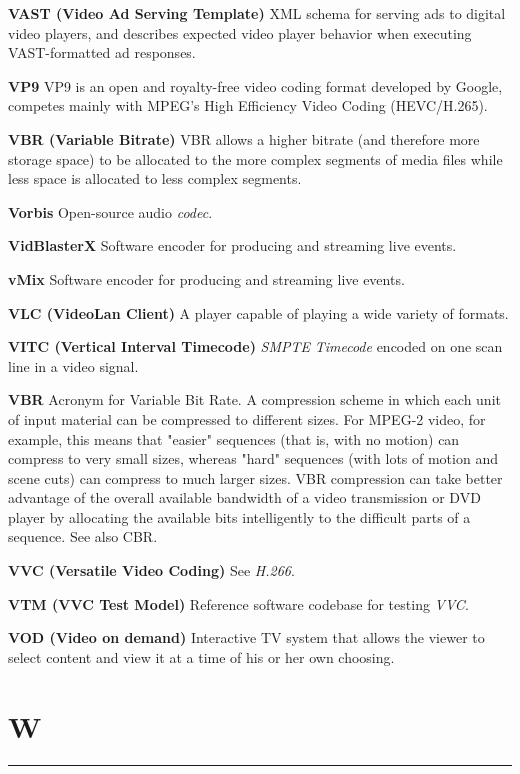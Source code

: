 \medskip
\textbf{VAST (Video Ad Serving Template)}
XML schema for serving ads to digital video players, and describes expected video player behavior when executing VAST-formatted ad responses.

\smallskip
\textbf{VP9}
VP9 is an open and royalty-free video coding format developed by Google, competes mainly with MPEG's High Efficiency Video Coding (HEVC/H.265).

\smallskip
\textbf{VBR (Variable Bitrate)}
VBR allows a higher bitrate (and therefore more storage space) to be allocated to the more complex segments of media files while less space is allocated to less complex segments.

\smallskip
\textbf{Vorbis}
Open-source audio \textit{codec}.

\smallskip
\textbf{VidBlasterX}
Software encoder for producing and streaming live events.

\smallskip
\textbf{vMix}
Software encoder for producing and streaming live events.

\smallskip
\textbf{VLC (VideoLan Client)}
A player capable of playing a wide variety of formats.

\smallskip
\textbf{VITC (Vertical Interval Timecode)}
\textit{SMPTE} \textit{Timecode} encoded on one scan line in a video signal.

\smallskip
\textbf{VBR}
Acronym for Variable Bit Rate. A compression scheme in which each unit of input material can be compressed to different sizes. For MPEG-2 video, for example, this means that "easier" sequences (that is, with no motion) can compress to very small sizes, whereas "hard" sequences (with lots of motion and scene cuts) can compress to much larger sizes. VBR compression can take better advantage of the overall available bandwidth of a video transmission or DVD player by allocating the available bits intelligently to the difficult parts of a sequence. See also CBR.

\smallskip
\textbf{VVC (Versatile Video Coding)}
See \textit{H.266}.

\smallskip
\textbf{VTM (VVC Test Model)}
Reference software codebase for testing \textit{VVC}.

\smallskip
\textbf{VOD (Video on demand)}
Interactive TV system that allows the viewer to select content and view it at a time of his or her own choosing.


\section{W}
\hrule

